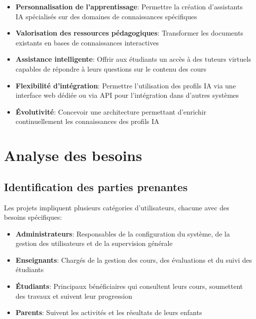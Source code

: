 \begin{itemize}
  \item \textbf{Personnalisation de l'apprentissage}: Permettre la création d'assistants IA spécialisés sur des domaines de connaissances spécifiques
  
  \item \textbf{Valorisation des ressources pédagogiques}: Transformer les documents existants en bases de connaissances interactives
  
  \item \textbf{Assistance intelligente}: Offrir aux étudiants un accès à des tuteurs virtuels capables de répondre à leurs questions sur le contenu des cours
  
  \item \textbf{Flexibilité d'intégration}: Permettre l'utilisation des profils IA via une interface web dédiée ou via API pour l'intégration dans d'autres systèmes
  
  \item \textbf{Évolutivité}: Concevoir une architecture permettant d'enrichir continuellement les connaissances des profils IA
\end{itemize}

\section{Analyse des besoins}

\subsection{Identification des parties prenantes}

Les projets impliquent plusieurs catégories d'utilisateurs, chacune avec des besoins spécifiques:

\begin{itemize}
  \item \textbf{Administrateurs}: Responsables de la configuration du système, de la gestion des utilisateurs et de la supervision générale
  
  \item \textbf{Enseignants}: Chargés de la gestion des cours, des évaluations et du suivi des étudiants
  
  \item \textbf{Étudiants}: Principaux bénéficiaires qui consultent leurs cours, soumettent des travaux et suivent leur progression
  
  \item \textbf{Parents}: Suivent les activités et les résultats de leurs enfants
  
\end{itemize}

